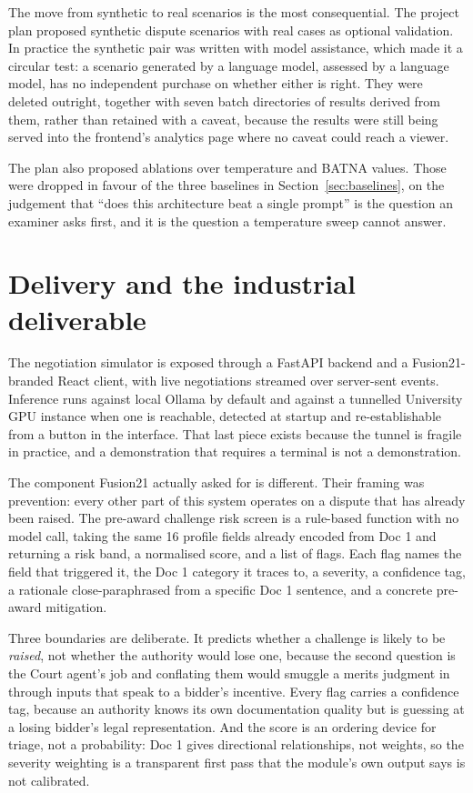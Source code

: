 The move from synthetic to real scenarios is the most consequential. The project
plan proposed synthetic dispute scenarios with real cases as optional validation.
In practice the synthetic pair was written with model assistance, which made it a
circular test: a scenario generated by a language model, assessed by a language
model, has no independent purchase on whether either is right. They were deleted
outright, together with seven batch directories of results derived from them,
rather than retained with a caveat, because the results were still being served
into the frontend's analytics page where no caveat could reach a viewer.

The plan also proposed ablations over temperature and BATNA values. Those were
dropped in favour of the three baselines in Section~\ref{sec:baselines}, on the
judgement that ``does this architecture beat a single prompt'' is the question an
examiner asks first, and it is the question a temperature sweep cannot answer.

\section{Delivery and the industrial deliverable}
\label{sec:risk-screen}

The negotiation simulator is exposed through a FastAPI backend and a
Fusion21-branded React client, with live negotiations streamed over server-sent
events. Inference runs against local Ollama by default and against a tunnelled
University GPU instance when one is reachable, detected at startup and
re-establishable from a button in the interface. That last piece exists because
the tunnel is fragile in practice, and a demonstration that requires a terminal is
not a demonstration.

The component Fusion21 actually asked for is different. Their framing was
prevention: every other part of this system operates on a dispute that has already
been raised. The pre-award challenge risk screen is a rule-based function with no
model call, taking the same 16 profile fields already encoded from Doc 1 and
returning a risk band, a normalised score, and a list of flags. Each flag names the
field that triggered it, the Doc 1 category it traces to, a severity, a confidence
tag, a rationale close-paraphrased from a specific Doc 1 sentence, and a concrete
pre-award mitigation.

Three boundaries are deliberate. It predicts whether a challenge is likely to be
\emph{raised}, not whether the authority would lose one, because the second
question is the Court agent's job and conflating them would smuggle a merits
judgment in through inputs that speak to a bidder's incentive. Every flag carries
a confidence tag, because an authority knows its own documentation quality but is
guessing at a losing bidder's legal representation. And the score is an ordering
device for triage, not a probability: Doc 1 gives directional relationships, not
weights, so the severity weighting is a transparent first pass that the module's
own output says is not calibrated.

